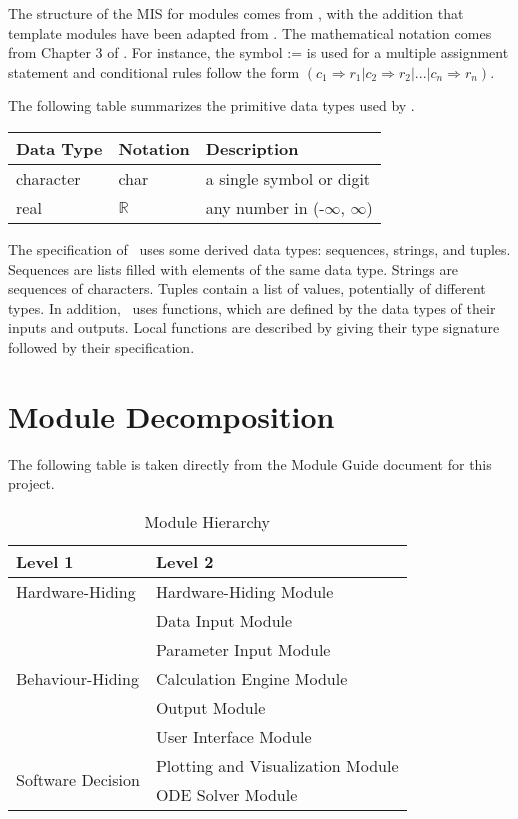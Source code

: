 \documentclass[12pt, titlepage]{article}
\begin{document}
The structure of the MIS for modules comes from \citet{HoffmanAndStrooper1995},
with the addition that template modules have been adapted from
\cite{GhezziEtAl2003}.  The mathematical notation comes from Chapter 3 of
\citet{HoffmanAndStrooper1995}.  For instance, the symbol := is used for a
multiple assignment statement and conditional rules follow the form $(c_1
\Rightarrow r_1 | c_2 \Rightarrow r_2 | ... | c_n \Rightarrow r_n )$.

The following table summarizes the primitive data types used by \progname. 

\begin{center}
\renewcommand{\arraystretch}{1.2}
\noindent 
\begin{tabular}{l l p{7.5cm}} 
\toprule 
\textbf{Data Type} & \textbf{Notation} & \textbf{Description}\\ 
\midrule
character & char & a single symbol or digit\\
real & $\mathbb{R}$ & any number in (-$\infty$, $\infty$)\\
\bottomrule
\end{tabular} 
\end{center}

\noindent
The specification of \progname \ uses some derived data types: sequences, strings, and
tuples. Sequences are lists filled with elements of the same data type. Strings
are sequences of characters. Tuples contain a list of values, potentially of
different types. In addition, \progname \ uses functions, which
are defined by the data types of their inputs and outputs. Local functions are
described by giving their type signature followed by their specification.

\section{Module Decomposition}

The following table is taken directly from the Module Guide document for this project.

\begin{table}[h!]
\centering
\begin{tabular}{p{} p{}}
\toprule
\textbf{Level 1} & \textbf{Level 2}\\
\midrule

{Hardware-Hiding} & Hardware-Hiding Module \\
\midrule

\multirow{5}{0.3\textwidth}{Behaviour-Hiding} & Data Input Module\\
& Parameter Input Module\\
& Calculation Engine Module\\
& Output Module\\
& User Interface Module\\ 
\midrule

\multirow{2}{0.3\textwidth}{Software Decision} & {Plotting and Visualization Module}\\
& ODE Solver Module\\
\bottomrule

\end{tabular}
\caption{Module Hierarchy}
\label{TblMH}
\end{table}
\end{document}
